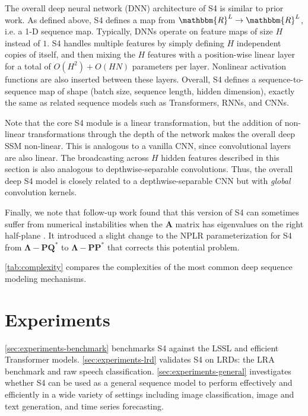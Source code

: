 The overall deep neural network (DNN) architecture of S4 is similar to prior work. As defined above, S4 defines a map from \( \mathbbm{R}^L \to \mathbbm{R}^L \), i.e. a 1-D sequence map. Typically, DNNs operate on feature maps of size \( H \) instead of \( 1 \).
S4 handles multiple features by simply defining \( H \) independent copies of itself, and then mixing the \( H \) features with a position-wise linear layer for a total of \( O(H^2) + O(HN) \) parameters per layer. Nonlinear activation functions are also inserted between these layers. Overall, S4 defines a sequence-to-sequence map of shape (batch size, sequence length, hidden dimension), exactly the same as related sequence models such as Transformers, RNNs, and CNNs.

Note that the core S4 module is a linear transformation, but the addition of non-linear transformations through the depth of the network makes the overall deep SSM non-linear. This is analogous to a vanilla CNN, since convolutional layers are also linear. The broadcasting across \( H \) hidden features described in this section is also analogous to depthwise-separable convolutions. Thus, the overall deep S4 model is closely related to a depthwise-separable CNN but with \emph{global} convolution kernels.

Finally, we note that follow-up work found that this version of S4 can sometimes suffer from numerical instabilities when the \( \bm{A} \) matrix has eigenvalues on the right half-plane \citep{goel2022sashimi}. It introduced a slight change to the NPLR parameterization for S4 from \( \bm{\Lambda} - \bm{P}\bm{Q}^* \) to \( \bm{\Lambda} - \bm{P}\bm{P}^* \) that corrects this potential problem.

\ref{tab:complexity} compares the complexities of the most common deep sequence modeling mechanisms.

\section{Experiments}
\label{sec:experiments}

\ref{sec:experiments-benchmark} benchmarks S4 against the LSSL and efficient Transformer models.
\ref{sec:experiments-lrd} validates S4 on LRDs: the LRA benchmark and raw speech classification.
\ref{sec:experiments-general} investigates whether S4 can be used as a general sequence model to perform effectively and efficiently in a wide variety of settings including image classification, image and text generation, and time series forecasting.

